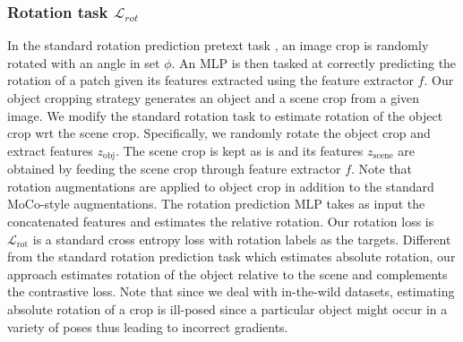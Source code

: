 \subsubsection{Rotation task $\mathcal{L}_{rot}$}
 In the standard rotation prediction pretext task \cite{Gidaris2018UnsupervisedRL}, an image crop is randomly rotated with an angle in set $\phi$. An MLP is then tasked at correctly predicting the rotation of a patch given its features extracted using the feature extractor $f$. Our object cropping strategy generates an object and a scene crop from a given image. We modify the standard rotation task to estimate rotation of the object crop wrt the scene crop. Specifically, we randomly rotate the object crop and extract features $z_{\text{obj}}$. The scene crop is kept as is and its features $z_{\text{scene}}$ are obtained by feeding the scene crop through feature extractor $f$. Note that rotation augmentations are applied to object crop in addition to the standard MoCo-style augmentations. The rotation prediction MLP takes as input the concatenated features and estimates the relative rotation. Our rotation loss is $\mathcal{L}_{\text{rot}}$ is a standard cross entropy loss with rotation labels as the targets. Different from the standard rotation prediction task which estimates absolute rotation, our approach estimates rotation of the object relative to the scene and complements the contrastive loss. Note that since we deal with in-the-wild datasets, estimating absolute rotation of a crop is ill-posed since a particular object might occur in a variety of poses thus leading to incorrect gradients. 
 
 
 



